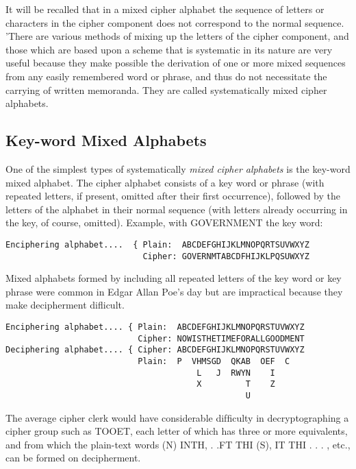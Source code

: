 It will be recalled that in a mixed cipher alphabet the sequence of
letters or characters in the cipher component does not correspond to the
normal sequence. 'There are various methods of mixing up the letters of
the cipher component, and those which are based upon a scheme that is
systematic in its nature are very useful because they make possible the
derivation of one or more mixed sequences from any easily remembered
word or phrase, and thus do not necessitate the carrying of written
memoranda. They are called systematically mixed cipher alphabets.

\subsection{Key-word Mixed Alphabets}

\mypara One of the simplest types of systematically \textit{mixed cipher alphabets}
is the key-word mixed alphabet. The cipher alphabet consists of a key
word or phrase (with repeated letters, if present, omitted after their ﬁrst
occurrence), followed by the letters of the alphabet in their normal
sequence (with letters already occurring in the key, of course, omitted).
Example, with GOVERNMENT the key word:
\begin{verbatim}
Enciphering alphabet....  { Plain:  ABCDEFGHIJKLMNOPQRTSUVWXYZ
                            Cipher: GOVERNMTABCDFHIJKLPQSUWXYZ
\end{verbatim}

\mypara Mixed alphabets formed by including all repeated letters of the key
word or key phrase were common in Edgar Allan Poe’s day but are
impractical because they make decipherment diﬂicult.

\begin{verbatim}
Enciphering alphabet.... { Plain:  ABCDEFGHIJKLMNOPQRSTUVWXYZ
                           Cipher: NOWISTHETIMEFORALLGOODMENT
Deciphering alphabet.... { Cipher: ABCDEFGHIJKLMNOPQRSTUVWXYZ
                           Plain:  P  VHMSGD  QKAB  OEF  C
                                       L   J  RWYN    I
                                       X         T    Z
                                                 U
\end{verbatim}

The average cipher clerk would have considerable difﬁculty in decryptographing a cipher group such as TOOET, each letter of which has three
or more equivalents, and from which the plain-text words (N) INTH,
. .FT THI (S), IT THI . . . , etc., can be formed on decipherment.

